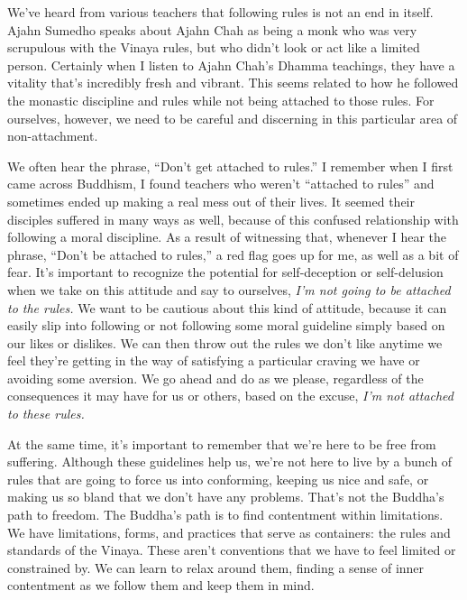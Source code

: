 We've heard from various teachers that following rules is not an end in 
itself. Ajahn Sumedho speaks about Ajahn Chah as being a monk who was 
very scrupulous with the Vinaya rules, but who didn't look or act like 
a limited person. Certainly when I listen to Ajahn Chah's Dhamma 
teachings, they have a vitality that's incredibly fresh and vibrant. 
This seems related to how he followed the monastic discipline and rules 
while not being attached to those rules. For ourselves, however, we 
need to be careful and discerning in this particular area of 
non-attachment.

We often hear the phrase, ``Don't get attached to rules.'' I remember 
when I first came across Buddhism, I found teachers who weren't 
``attached to rules'' and sometimes ended up making a real mess out of 
their lives. It seemed their disciples suffered in many ways as well, 
because of this confused relationship with following a moral 
discipline. As a result of witnessing that, whenever I hear the phrase, 
``Don't be attached to rules,'' a red flag goes up for me, as well as a 
bit of fear. It's important to recognize the potential for 
self-deception or self-delusion when we take on this attitude and say 
to ourselves, \emph{I'm not going to be attached to the rules.} We want 
to be cautious about this kind of attitude, because it can easily slip 
into following or not following some moral guideline simply based on 
our likes or dislikes. We can then throw out the rules we don't like 
anytime we feel they're getting in the way of satisfying a particular 
craving we have or avoiding some aversion. We go ahead and do as we 
please, regardless of the consequences it may have for us or others, 
based on the excuse, \emph{I'm not attached to these rules.}

At the same time, it's important to remember that we're here to be free 
from suffering. Although these guidelines help us, we're not here to 
live by a bunch of rules that are going to force us into conforming, 
keeping us nice and safe, or making us so bland that we don't have any 
problems. That's not the Buddha's path to freedom. The Buddha's path is 
to find contentment within limitations. We have limitations, forms, and 
practices that serve as containers: the rules and standards of the 
Vinaya. These aren't conventions that we have to feel limited or 
constrained by. We can learn to relax around them, finding a sense of 
inner contentment as we follow them and keep them in mind.

